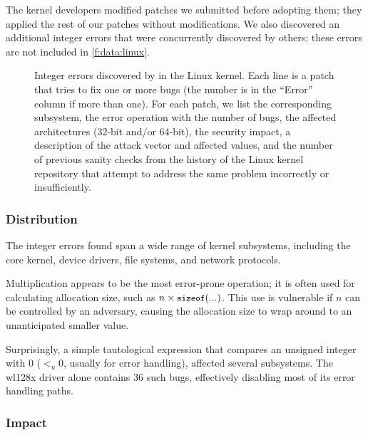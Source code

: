 The kernel developers modified \nrpatchesmod patches we submitted
before adopting them; they applied the rest of our patches without
modifications.
%
We also discovered an additional \nrbugsbyothers integer errors that
were concurrently discovered by others; these errors are not included
in \autoref{f:data:linux}.

\begin{figure*}
\centering
\footnotesize

\caption{Integer errors discovered by \sys in the Linux
kernel.  Each line is a patch that tries to fix one
or more bugs (the number is in the ``Error'' column if more than
one).  For each patch, we list the corresponding subsystem, the
error operation with the number of bugs, the affected architectures
(32-bit and/or 64-bit), the security impact, a
description of the attack vector and affected values, and
the number of previous sanity checks from the history of the 
Linux kernel repository that attempt to address the same problem
incorrectly or insufficiently. }
\label{f:data:linux}
\end{figure*}

\subsubsection{Distribution}

The integer errors \sys found span a wide range of kernel subsystems,
including the core kernel, device drivers, file systems, and network
protocols.

Multiplication appears to be the most error-prone operation; it is
often used for calculating allocation size, such as $n \times
\cc{sizeof}(...)$.  This use is vulnerable if $n$ can be controlled
by an adversary, causing the allocation size to wrap around to an
unanticipated smaller value.

Surprisingly,  a simple tautological expression that 
compares an unsigned integer with 0 ($<_u 0$, usually for error handling),
affected several subsystems.
The wl128x driver alone contains 36 such bugs, effectively
disabling most of its error handling paths.

\subsubsection{Impact}

